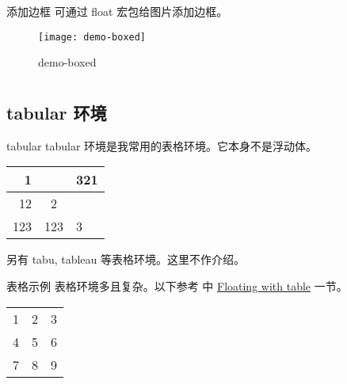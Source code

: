 \documentclass[]{ctexbeamer}
\begin{document}
\begin{frame}[fragile]{添加边框}
可通过 float 宏包给图片添加边框。
\end{frame}


\begin{frame}
\begin{figure}[]
  \centering
  \texttt{[image: demo-boxed]}
  \caption{demo-boxed}
  \label{demo-boxed}
\end{figure}
\end{frame}



\section{}
% 
\subsection{tabular 环境}
\begin{frame}[fragile]{tabular}
tabular 环境是我常用的表格环境。它本身不是浮动体。
\begin{sidelst}
\begin{tabular}{|r|c|l|}
\cline{1-1} \cline{3-3}
1 & & 321 \\ \hline
12 & 2 \\[.5cm] \hline
123 & 123 & 3 \\ \hline
\end{tabular}
\end{sidelst}
另有 tabu, tableau 等表格环境。这里不作介绍。
\end{frame}


\begin{frame}[fragile]{表格示例}
表格环境多且复杂。以下参考 \cite{wiki:tables} 中 \href{https://en.wikibooks.org/wiki/LaTeX/Tables\#Floating\_with\_table}{Floating with table} 一节。
\begin{sidelst}
\centering     %
\begin{tabular}{r | l c}  %
1 & 2 & 3 \\              %
4 & 5 & 6 \\
7 & 8 & 9 \\ \hline       %
\end{tabular}
\end{sidelst}
\end{frame}
\end{document}
